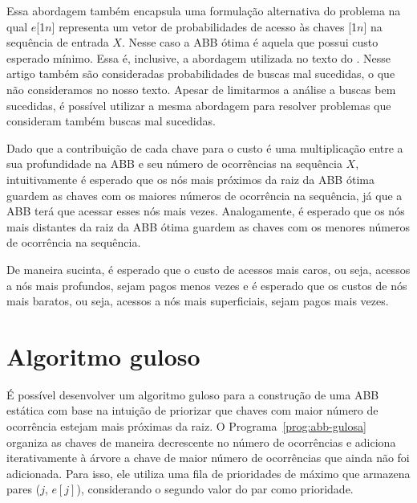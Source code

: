 Essa abordagem também encapsula uma formulação alternativa do problema na qual $e$[1\tdots$n$] representa um vetor de probabilidades de acesso às chaves [1\tdots$n$] na sequência de entrada $X$. Nesse caso a ABB ótima é aquela que possui custo esperado mínimo. Essa é, inclusive, a abordagem utilizada no texto do \cite{knuth}. Nesse artigo também são consideradas probabilidades de buscas mal sucedidas, o que não consideramos no nosso texto. Apesar de limitarmos a análise a buscas bem sucedidas, é possível utilizar a mesma abordagem para resolver problemas que consideram também buscas mal sucedidas.

Dado que a contribuição de cada chave para o custo é uma multiplicação entre a sua profundidade na ABB e seu número de ocorrências na sequência $X$, intuitivamente é esperado que os nós mais próximos da raiz da ABB ótima guardem as chaves com os maiores números de ocorrência na sequência, já que a ABB terá que acessar esses nós mais vezes. Analogamente, é esperado que os nós mais distantes da raiz da ABB ótima guardem as chaves com os menores números de ocorrência na sequência.

De maneira sucinta, é esperado que o custo de acessos mais caros, ou seja, acessos a nós mais profundos, sejam pagos menos vezes e é esperado que os custos de nós mais baratos, ou seja, acessos a nós mais superficiais, sejam pagos mais vezes.

\section{Algoritmo guloso}

É possível desenvolver um algoritmo guloso para a construção de uma ABB estática com base na intuição de priorizar que chaves com maior número de ocorrência estejam mais próximas da raiz. O Programa~\ref{prog:abb-gulosa} organiza as chaves de maneira decrescente no número de ocorrências e adiciona iterativamente à árvore a chave de maior número de ocorrências que ainda não foi adicionada. Para isso, ele utiliza uma fila de prioridades de máximo que armazena pares ($j$, $e[j]$), considerando o segundo valor do par como prioridade.

